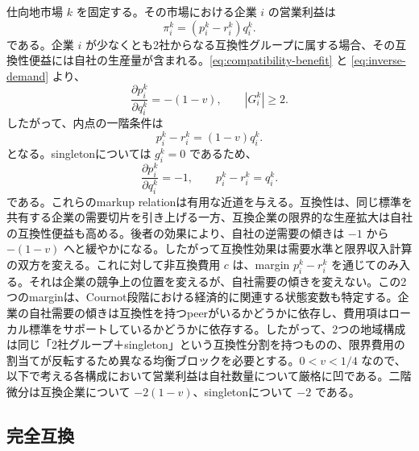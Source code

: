 仕向地市場 $k$ を固定する。その市場における企業 $i$ の営業利益は
\begin{equation}
    \pi_i^k=(p_i^k-r_i^k)q_i^k.
    \label{eq:market-operating-profit}
\end{equation}
である。企業 $i$ が少なくとも2社からなる互換性グループに属する場合、その互換性便益には自社の生産量が含まれる。\eqref{eq:compatibility-benefit} と \eqref{eq:inverse-demand} より、
\begin{equation}
    \frac{\partial p_i^k}{\partial q_i^k}=-(1-v),
    \qquad |G_i^k|\ge 2.
    \label{eq:compatible-own-slope}
\end{equation}
したがって、内点の一階条件は
\begin{equation}
    p_i^k-r_i^k=(1-v)q_i^k.
    \label{eq:compatible-markup}
\end{equation}
となる。singletonについては $g_i^k=0$ であるため、
\begin{equation}
    \frac{\partial p_i^k}{\partial q_i^k}=-1,
    \qquad
    p_i^k-r_i^k=q_i^k.
    \label{eq:singleton-markup}
\end{equation}
である。これらのmarkup relationは有用な近道を与える。互換性は、同じ標準を共有する企業の需要切片を引き上げる一方、互換企業の限界的な生産拡大は自社の互換性便益も高める。後者の効果により、自社の逆需要の傾きは $-1$ から $-(1-v)$ へと緩やかになる。したがって互換性効果は需要水準と限界収入計算の双方を変える。これに対して非互換費用 $c$ は、margin $p_i^k-r_i^k$ を通じてのみ入る。それは企業の競争上の位置を変えるが、自社需要の傾きを変えない。この2つのmarginは、Cournot段階における経済的に関連する状態変数も特定する。企業の自社需要の傾きは互換性を持つpeerがいるかどうかに依存し、費用項はローカル標準をサポートしているかどうかに依存する。したがって、2つの地域構成は同じ「2社グループ＋singleton」という互換性分割を持つものの、限界費用の割当てが反転するため異なる均衡ブロックを必要とする。$0<v<1/4$ なので、以下で考える各構成において営業利益は自社数量について厳格に凹である。二階微分は互換企業について $-2(1-v)$、singletonについて $-2$ である。

\subsection{完全互換}
\label{subsec:product-market-complete}

